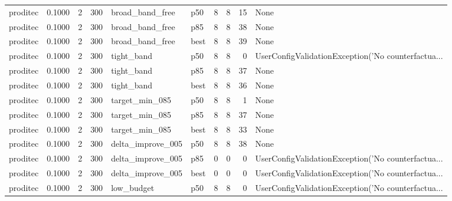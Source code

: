 \begin{tabular}{lrrrllrrrl}
proditec &    0.1000 &    2 &    300 &      broad\_band\_free &    p50 &               8 &          8 &      15 &                                               None \\
proditec &    0.1000 &    2 &    300 &      broad\_band\_free &    p85 &               8 &          8 &      38 &                                               None \\
proditec &    0.1000 &    2 &    300 &      broad\_band\_free &   best &               8 &          8 &      39 &                                               None \\
proditec &    0.1000 &    2 &    300 &           tight\_band &    p50 &               8 &          8 &       0 & UserConfigValidationException('No counterfactua... \\
proditec &    0.1000 &    2 &    300 &           tight\_band &    p85 &               8 &          8 &      37 &                                               None \\
proditec &    0.1000 &    2 &    300 &           tight\_band &   best &               8 &          8 &      36 &                                               None \\
proditec &    0.1000 &    2 &    300 &       target\_min\_085 &    p50 &               8 &          8 &       1 &                                               None \\
proditec &    0.1000 &    2 &    300 &       target\_min\_085 &    p85 &               8 &          8 &      37 &                                               None \\
proditec &    0.1000 &    2 &    300 &       target\_min\_085 &   best &               8 &          8 &      33 &                                               None \\
proditec &    0.1000 &    2 &    300 &    delta\_improve\_005 &    p50 &               8 &          8 &      38 &                                               None \\
proditec &    0.1000 &    2 &    300 &    delta\_improve\_005 &    p85 &               0 &          0 &       0 & UserConfigValidationException('No counterfactua... \\
proditec &    0.1000 &    2 &    300 &    delta\_improve\_005 &   best &               0 &          0 &       0 & UserConfigValidationException('No counterfactua... \\
proditec &    0.1000 &    2 &    300 &           low\_budget &    p50 &               8 &          8 &       0 & UserConfigValidationException('No counterfactua... \\

\end{tabular}
